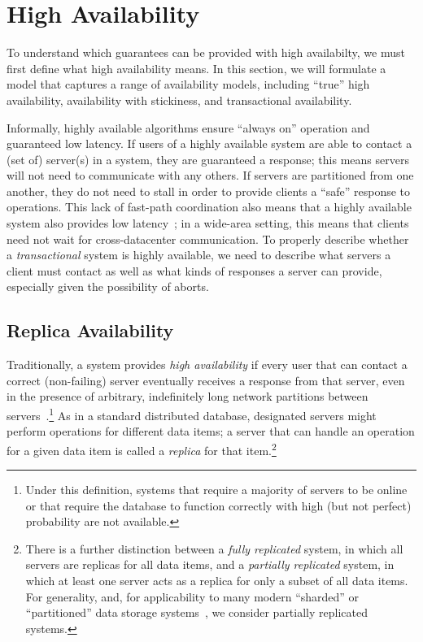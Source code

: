 
\section{High Availability}
\label{sec:availability}

To understand which guarantees can be provided with high availabilty,
we must first define what high availability means. In this section, we
will formulate a model that captures a range of availability models,
including ``true'' high availability, availability with stickiness,
and transactional availability.

Informally, highly available algorithms ensure ``always on'' operation
and guaranteed low latency. If users of a highly available system are
able to contact a (set of) server(s) in a system, they are guaranteed
a response; this means servers will not need to communicate with any
others. If servers are partitioned from one another, they do not need
to stall in order to provide clients a ``safe'' response to
operations. This lack of fast-path coordination also means that a
highly available system also provides low latency~\cite{abadi-pacelc};
in a wide-area setting, this means that clients need not wait for
cross-datacenter communication. To properly describe whether a
\textit{transactional} system is highly available, we need to describe
what servers a client must contact as well as what kinds of responses
a server can provide, especially given the possibility of aborts.

\subsection{Replica Availability}

Traditionally, a system provides {\em high availability} if every user
that can contact a correct (non-failing) server eventually receives a
response from that server, even in the presence of arbitrary,
indefinitely long network partitions between
servers~\cite{gilbert-cap}.\footnote{Under this definition, systems
  that require a majority of servers to be online or that require the
  database to function correctly with high (but not perfect)
  probability are not available.} As in a standard distributed
database, designated servers might perform operations for different
data items; a server that can handle an operation for a given data
item is called a \textit{replica} for that item.\footnote{There is a
  further distinction between a \textit{fully replicated} system, in
  which all servers are replicas for all data items, and a
  \textit{partially replicated} system, in which at least one server
  acts as a replica for only a subset of all data items. For
  generality, and, for applicability to many modern ``sharded'' or
  ``partitioned'' data storage systems~\cite{dynamo, pnuts, bigtable,
    spanner, hstore}, we consider partially replicated systems.} 

